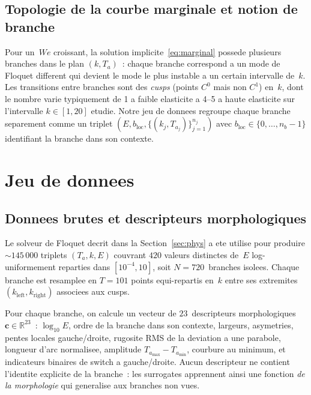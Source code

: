 \documentclass[11pt,a4paper]{article}
\newcommand{\R}{\mathbb{R}}
\newcommand{\We}{\mathit{We}}
\newcommand{\Ta}{T_a}
\begin{document}
\subsection{Topologie de la courbe marginale et notion de branche}

Pour un~$\We$ croissant, la solution
implicite~\eqref{eq:marginal} possede plusieurs branches dans le
plan $(k,\Ta)$~: chaque branche correspond a un mode de Floquet
different qui devient le mode le plus instable a un certain
intervalle de~$k$. Les transitions entre branches sont des
\emph{cusps} (points $C^0$ mais non $C^1$) en~$k$, dont le nombre
varie typiquement de 1 a faible elasticite a 4--5 a haute
elasticite sur l'intervalle $k\!\in\![1,20]$ etudie. Notre jeu de
donnees regroupe chaque branche separement comme un triplet
$(E,b_{\text{loc}},\{(k_j,\Ta_j)\}_{j=1}^{n_j})$ avec
$b_{\text{loc}}\!\in\!\{0,\ldots,n_b\!-\!1\}$ identifiant la
branche dans son contexte.


\section{Jeu de donnees}
\label{sec:data}

\subsection{Donnees brutes et descripteurs morphologiques}

Le solveur de Floquet decrit dans la Section~\ref{sec:phys} a
ete utilise pour produire $\sim\!145\,000$ triplets
$(\Ta,k,E)$ couvrant $420$ valeurs distinctes de~$E$
log-uniformement reparties dans $[10^{-4},10]$, soit
$N\!=\!720$~branches isolees. Chaque branche est resamplee en
$T\!=\!101$ points equi-repartis en~$k$ entre ses extremites
$(k_\text{left},k_\text{right})$ associees aux cusps.

Pour chaque branche, on calcule un vecteur de $23$~descripteurs
morphologiques~$\mathbf{c}\in\R^{23}$~: $\log_{10}E$,
ordre de la branche dans son contexte, largeurs, asymetries,
pentes locales gauche/droite, rugosite RMS de la deviation a une
parabole, longueur d'arc normalisee, amplitude
$\Ta_\text{max}-\Ta_\text{min}$, courbure au minimum, et indicateurs
binaires de switch a gauche/droite. Aucun descripteur ne contient
l'identite explicite de la branche~: les surrogates apprennent
ainsi une fonction \emph{de la morphologie} qui generalise aux
branches non vues.
\end{document}
